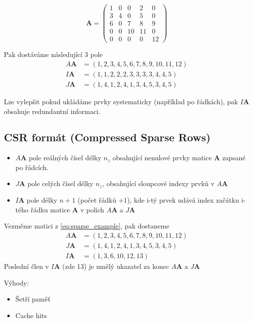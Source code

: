 \documentclass[../main.tex]{subfiles}
\begin{document}
\begin{example}
    \begin{equation}\label{eq:sparse_example}
        \mathbf{A} = \begin{pmatrix}
            1 & 0 & 0 & 2 & 0 \\
            3 & 4 & 0 & 5 & 0 \\
            6 & 0 & 7 & 8 & 9 \\
            0 & 0 & 10 & 11 & 0 \\
            0 & 0 & 0 & 0 & 12 
            \end{pmatrix} 
    \end{equation}

Pak dostáváme následující 3 pole
\begin{align*}
    A\mathbf{A} &= (1,2,3,4,5,6,7,8,9,10,11,12)\\
    I\mathbf{A} &= (1,1,2,2,2,3,3,3,3,4,4,5)\\
    J\mathbf{A} &= (1,4,1,2,4,1,3,4,5,3,4,5)
\end{align*}

Lze vylepšit pokud ukládáme prvky systematicky (například po řádkách), pak $I\mathbf{A}$ obsahuje redundantní informaci.

\end{example}


\subsection{CSR formát (Compressed Sparse Rows)}

\begin{itemize}
    \item $A\mathbf{A}$ pole reálných čísel délky $n_z$ obsahující nenulové prvky matice $\mathbf{A}$ zapsané po řádcích.
    \item $J\mathbf{A}$ pole celých čísel délky $n_z$, obsahující sloupcové indexy prvků v $A\mathbf{A}$
    \item $I\mathbf{A}$ pole délky $n + 1$  (počet řádků $+1$), kde i-tý prvek udává index začátku i-tého řádku matice $\mathbf{A}$ v polích $A\mathbf{A}$ a $J\mathbf{A}$
\end{itemize}


\begin{example}
    Vezměme matici z \eqref{eq:sparse_example}, pak dostaneme
    \begin{align*}
        A\mathbf{A} &= (1,2,3,4,5,6,7,8,9,10,11,12)\\
        J\mathbf{A} &= (1,4,1,2,4,1,3,4,5,3,4,5)\\
        I\mathbf{A} &= (1,3,6,10,12,13)
    \end{align*}
    Poslední člen v $I\mathbf{A}$ (zde 13) je umělý ukazatel za konec $A\mathbf{A}$ a $J\mathbf{A}$

\end{example}
Výhody: \begin{itemize}
    \item Šetří paměť
    \item Cache hits
\end{itemize}
\end{document}
